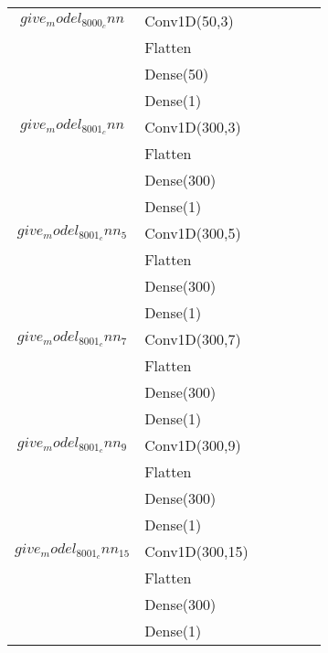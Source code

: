 \begin{longtable}{| c | m{0.58\linewidth} | r | m{0.1\linewidth} |}
    $give_model_8000_cnn$          & Conv1D(50,3)                  \\
                                   & Flatten                       \\
                                   & Dense(50)                     \\
                                   & Dense(1)                      \\ \hline
    $give_model_8001_cnn$          & Conv1D(300,3)                 \\
                                   & Flatten                       \\
                                   & Dense(300)                    \\
                                   & Dense(1)                      \\ \hline
    $give_model_8001_cnn_5$        & Conv1D(300,5)                 \\
                                   & Flatten                       \\
                                   & Dense(300)                    \\
                                   & Dense(1)                      \\ \hline
    $give_model_8001_cnn_7$        & Conv1D(300,7)                 \\
                                   & Flatten                       \\
                                   & Dense(300)                    \\
                                   & Dense(1)                      \\ \hline
    $give_model_8001_cnn_9$        & Conv1D(300,9)                 \\
                                   & Flatten                       \\
                                   & Dense(300)                    \\
                                   & Dense(1)                      \\ \hline
    $give_model_8001_cnn_15$       & Conv1D(300,15)                \\
                                   & Flatten                       \\
                                   & Dense(300)                    \\
                                   & Dense(1)                      \\ \hline

\end{longtable}
